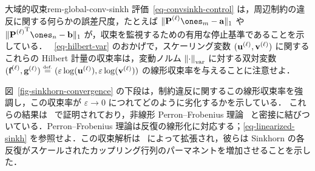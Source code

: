 \begin{rem11}{大域的収束}{rem-global-conv-sinkh}
評価~\eqref{eq-convsinkh-control} は，周辺制約の違反に関する何らかの誤差尺度，たとえば $\| \it{\P} \ones_m - \a \|_1$ や $\|\transp{\it{\P}} \ones_n - \b \|_1$ が，収束を監視するための有用な停止基準であることを示している．
%
~\eqref{eq-hilbert-var} のおかげで，スケーリング変数 $(\mathrm{\textbf{u}}^{(\ell)},\mathrm{\textbf{v}}^{(\ell)})$ に関するこれらの Hilbert 計量の収束率は，変動ノルム $\left\| \cdot \right\|_{\text{var}}$ に対する双対変数 $(\mathrm{\textbf{f}}^{(\ell)},\mathrm{\textbf{g}}^{(\ell)}) \stackrel{\mbox{\upshape\tiny def.}}{=} (\varepsilon\log(\mathrm{\textbf{u}}^{(\ell)}),\varepsilon\log(\mathrm{\textbf{v}}^{(\ell)}))$ の線形収束率を与えることに注意せよ．

図~\ref{fig-sinkhorn-convergence} の下段は，制約違反に関するこの線形収束率を強調し，この収束率が $\varepsilon\rightarrow 0$ につれてどのように劣化するかを示している．
%
これらの結果は~\citep{franklin1989scaling} で証明されており，非線形 Perron--Frobenius 理論~\citep{lemmens2012nonlinear} と密接に結びついている．Perron--Frobenius 理論は反復の線形化に対応する；\eqref{eq-linearized-sinkh} を参照せよ．この収束解析は~\citep{linial1998deterministic} によって拡張され，彼らは Sinkhorn の各反復がスケールされたカップリング行列のパーマネントを増加させることを示した．
\end{rem11}



